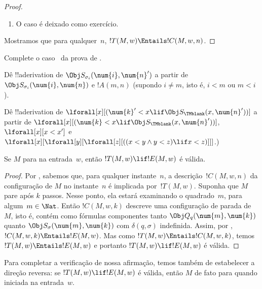 \documentclass[../../../include/open-logic-section]{subfiles}
\begin{document}
\begin{proof}
\begin{enumerate}
\item O caso  é deixado como exercício.
\end{enumerate}
Mostramos que para qualquer~$n$, $!T(M, w) \Entails !C(M, w, n)$.
\end{proof}

\begin{prob}
Complete o caso~ da prova de
.
\end{prob}

\begin{prob}
Dê !!a{derivation} de $\Obj S_{\sigma_i}(\num{i}, \num{n}')$ a partir de
$\Obj S_{\sigma_i}(\num{i}, \num{n})$ e $!A(m, n)$ (supondo $i \neq
m$, isto é, $i < m$ ou $m < i$).
\end{prob}

\begin{prob}
Dê !!a{derivation} de $\lforall[x][(\num{k}' < x \lif \Obj
  S_\TMblank(x, \num{n}'))]$ a partir de $\lforall[x][(\num{k} < x \lif \Obj
  S_\TMblank(x, \num{n}'))]$, $\lforall[x][x < x']$ e
$\lforall[x][\lforall[y][\lforall[z][ ((x < y \land y < z) \lif x <
      z)]]]$.)
\end{prob}


\begin{lem}
Se $M$ para na entrada~$w$, então $!T(M, w) \lif
!E(M, w)$ é válida.
\end{lem}

\begin{proof}
Por , sabemos que, para qualquer instante~$n$, a
descrição~$!C(M, w, n)$ da configuração de $M$ no instante~$n$ é
implicada por~$!T(M, w)$.  Suponha que $M$ pare após $k$ passos. Nesse
ponto, ela estará examinando o quadrado~$m$, para algum~$m \in \Nat$.
Então $!C(M, w, k)$ descreve uma configuração de parada de~$M$, isto
é, contém como fórmulas componentes tanto $\Obj Q_q(\num{m}, \num{k})$
quanto $\Obj S_\sigma(\num{m}, \num{k})$ com $\delta(q,\sigma)$
indefinida.  Assim, por , $!C(M,
w, k) \Entails !E(M, w)$. Mas como $!T(M, w) \Entails !C(M, w, k)$,
temos $!T(M, w) \Entails !E(M, w)$ e portanto $!T(M, w) \lif !E(M, w)$
é válida.
\end{proof}


\begin{explain} 
Para completar a verificação de nossa afirmação, temos também de
estabelecer a direção reversa: se $!T(M, w) \lif !E(M, w)$ é válida,
então $M$ de fato para quando iniciada na entrada~$w$. 
\end{explain}
\end{document}
